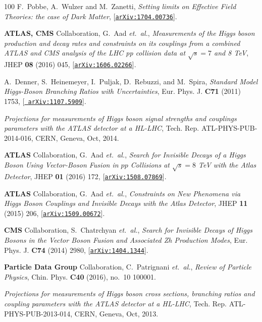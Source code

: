 \documentclass[11pt]{article}
\renewcommand{\[}{\begin{equation}}
\renewcommand{\]}{\end{equation}}
\begin{document}
\begin{thebibliography}{100}
  F.~Pobbe, A.~Wulzer and M.~Zanetti,
  {\it {Setting limits on Effective Field Theories: the case of Dark Matter}},
  [\href{http://xxx.lanl.gov/abs/1704.00736}{{\tt arXiv:1704.00736}}].

{\bf ATLAS, CMS} Collaboration, G.~Aad {\em et.~al.}, {\it {Measurements of the
  Higgs boson production and decay rates and constraints on its couplings from
  a combined ATLAS and CMS analysis of the LHC pp collision data at $
  \sqrt{s}=7 $ and 8 TeV}},  JHEP {\bf 08} (2016) 045,
  [\href{http://xxx.lanl.gov/abs/1606.02266}{{\tt arXiv:1606.02266}}].

A.~Denner, S.~Heinemeyer, I.~Puljak, D.~Rebuzzi, and M.~Spira, {\it {Standard
  Model Higgs-Boson Branching Ratios with Uncertainties}},  Eur. Phys. J. {\bf
  C71} (2011) 1753, [\href{http://xxx.lanl.gov/abs/1107.5909}{{\tt
  arXiv:1107.5909}}].

{\it {Projections for measurements of Higgs boson signal strengths and
  couplings parameters with the ATLAS detector at a HL-LHC}},  Tech. Rep.
  ATL-PHYS-PUB-2014-016, CERN, Geneva, Oct, 2014.

{\bf ATLAS} Collaboration, G.~Aad {\em et.~al.}, {\it {Search for Invisible
  Decays of a Higgs Boson Using Vector-Boson Fusion in $pp$ Collisions at
  $\sqrt{s}=8$ TeV with the Atlas Detector}},  JHEP {\bf 01} (2016) 172,
  [\href{http://xxx.lanl.gov/abs/1508.07869}{{\tt arXiv:1508.07869}}].

{\bf ATLAS} Collaboration, G.~Aad {\em et.~al.}, {\it {Constraints on New
  Phenomena via Higgs Boson Couplings and Invisible Decays with the Atlas
  Detector}},  JHEP {\bf 11} (2015) 206,
  [\href{http://xxx.lanl.gov/abs/1509.00672}{{\tt arXiv:1509.00672}}].

{\bf CMS} Collaboration, S.~Chatrchyan {\em et.~al.}, {\it {Search for
  Invisible Decays of Higgs Bosons in the Vector Boson Fusion and Associated Zh
  Production Modes}},  Eur. Phys. J. {\bf C74} (2014) 2980,
  [\href{http://xxx.lanl.gov/abs/1404.1344}{{\tt arXiv:1404.1344}}].

{\bf Particle Data Group} Collaboration, C.~Patrignani {\em et.~al.}, {\it
  {Review of Particle Physics}},  Chin. Phys. {\bf C40} (2016), no.~10 100001.

{\it {Projections for measurements of Higgs boson cross sections, branching
  ratios and coupling parameters with the ATLAS detector at a HL-LHC}},  Tech.
  Rep. ATL-PHYS-PUB-2013-014, CERN, Geneva, Oct, 2013.


\end{thebibliography}
\end{document}

